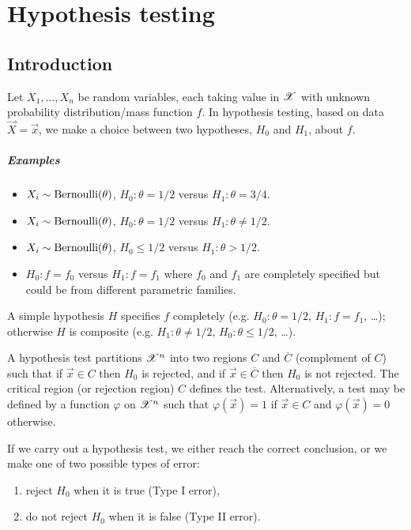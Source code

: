 
\chapter{Hypothesis testing}

\section{Introduction}

Let $X_1, \dotsc, X_n$ be \iid random variables, each taking value in $\mathscr{X}$ with unknown probability distribution/mass function $f$.
In hypothesis testing, based on data $\vec{X} = \vec{x}$, we make a choice between two hypotheses, $H_0$ and $H_1$, about $f$.

\paragraph{Examples}
\begin{itemize}
\item $X_i \sim \operatorname{Bernoulli}(\theta)$, $H_0 : \theta = 1/2$ versus $H_1 : \theta = 3/4$.
\item $X_i \sim \operatorname{Bernoulli}(\theta)$, $H_0 : \theta = 1/2$ versus $H_1 : \theta \neq 1/2$.
\item $X_i \sim \operatorname{Bernoulli}(\theta)$, $H_0 \leq 1/2$ versus $H_1 : \theta > 1/2$.
\item $H_0 : f = f_0$ versus $H_1 : f = f_1$ where $f_0$ and $f_1$ are completely specified but could be from different parametric families.
\end{itemize}

A simple hypothesis $H$ specifies $f$ completely (e.g. $H_0 : \theta = 1/2$, $H_1 : f = f_1$, \dots); otherwise $H$ is composite (e.g. $H_1 : \theta \neq 1/2$, $H_0 : \theta \leq 1/2$, \dots).

A hypothesis test partitions $\mathscr{X}^n$ into two regions $C$ and $\overline{C}$ (complement of $C$) such that if $\vec{x} \in C$ then $H_0$ is rejected, and if $\vec{x} \in \overline{C}$ then $H_0$ is not rejected.
The critical region (or rejection region) $C$ defines the test.
Alternatively, a test may be defined by a function $\varphi$ on $\mathscr{X}^n$ such that $\varphi(\vec{x}) = 1$ if $\vec{x} \in C$ and $\varphi(\vec{x}) = 0$ otherwise.

If we carry out a hypothesis test, we either reach the correct conclusion, or we make one of two possible types of error:
\begin{enumerate}
\item reject $H_0$ when it is true (Type I error),
\item do not reject $H_0$ when it is false (Type II error).
\end{enumerate}

